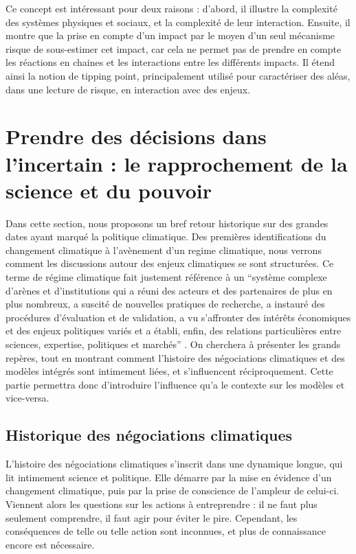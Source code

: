 Ce concept est intéressant pour deux raisons : d'abord, il illustre la complexité des systèmes physiques et sociaux, et la complexité de leur interaction. Ensuite, il montre que la prise en compte d'un impact par le moyen d'un seul mécanisme risque de sous-estimer cet impact, car cela ne permet pas de prendre en compte les réactions en chaines et les interactions entre les différents impacts. Il étend ainsi la notion de tipping point, principalement utilisé pour caractériser des aléas, dans une lecture de risque, en interaction avec des enjeux. 

\section{Prendre des décisions dans l'incertain : le rapprochement de la science et du pouvoir}
\label{sect/1/2}

Dans cette section, nous proposons un bref retour historique sur des grandes dates ayant marqué la politique climatique. Des premières identifications du changement climatique à l'avènement d'un \gls{regime climatique}, nous verrons comment les discussions autour des enjeux climatiques se sont structurées. Ce terme de régime climatique fait justement référence à un  \enquote{système complexe d’arènes et d’institutions qui a réuni des acteurs et des partenaires de plus en plus nombreux, a suscité de nouvelles pratiques de recherche, a instauré des procédures d’évaluation et de validation, a vu s’affronter des intérêts économiques et des enjeux politiques variés et a établi, enfin, des relations particulières entre sciences, expertise, politiques et marchés} \autocite{aykut_gouverner_2015}. On cherchera à présenter les grands repères, tout en montrant comment l'histoire des négociations climatiques et des modèles intégrés sont intimement liées, et s'influencent réciproquement. Cette partie permettra donc d'introduire l'influence qu'a le contexte sur les modèles et vice-versa. 


\subsection{Historique des négociations climatiques}
\label{sect:1.2.1}

L'histoire des négociations climatiques s'inscrit dans une dynamique longue, qui lit intimement science et politique. Elle démarre par la mise en évidence d'un changement climatique, puis par la prise de conscience de l'ampleur de celui-ci. Viennent alors les questions sur les actions à entreprendre : il ne faut plus seulement comprendre, il faut agir pour éviter le pire. Cependant, les conséquences de telle ou telle action sont inconnues, et plus de connaissance encore est nécessaire. \\

